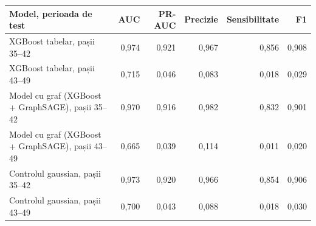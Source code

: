 \begin{tabular}{lrrrrr}
\toprule
Model, perioada de test & AUC & PR-AUC & Precizie & Sensibilitate & F1 \\
\midrule
XGBoost tabelar, pașii 35--42 & 0,974 & 0,921 & 0,967 & 0,856 & 0,908 \\
XGBoost tabelar, pașii 43--49 & 0,715 & 0,046 & 0,083 & 0,018 & 0,029 \\
Model cu graf (XGBoost + GraphSAGE), pașii 35--42 & 0,970 & 0,916 & 0,982 & 0,832 & 0,901 \\
Model cu graf (XGBoost + GraphSAGE), pașii 43--49 & 0,665 & 0,039 & 0,114 & 0,011 & 0,020 \\
Controlul gaussian, pașii 35--42 & 0,973 & 0,920 & 0,966 & 0,854 & 0,906 \\
Controlul gaussian, pașii 43--49 & 0,700 & 0,043 & 0,088 & 0,018 & 0,030 \\
\bottomrule
\end{tabular}
